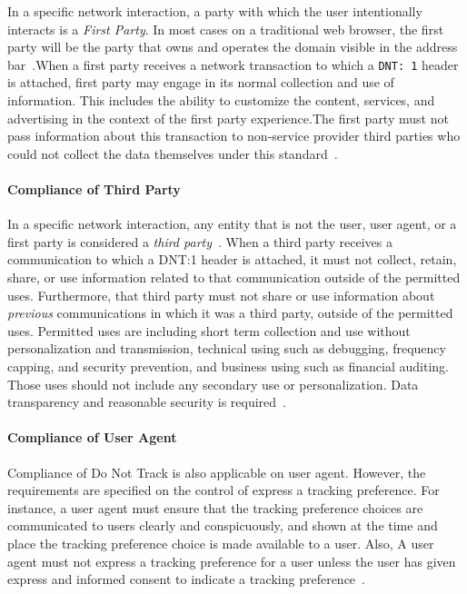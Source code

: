 \documentclass{sig-alternate}
\begin{document}
In a specific network interaction, a party with which the user intentionally interacts is a \emph{First Party}. In most cases on a traditional web browser, the first party will be the party that owns and operates the domain visible in the address bar~\cite{w3ctrackingcompliance}.When a first party receives a network transaction to which a \verb|DNT: 1| header is attached, first party may engage in its normal collection and use of information. This includes the ability to customize the content, services, and advertising in the context of the first party experience.The first party must not pass information about this transaction to non-service provider third parties who could not collect the data themselves under this standard~\cite{w3ctrackingcompliance}.

\paragraph{Compliance of Third Party}

In a specific network interaction, any entity that is not the user, user agent, or a first party is considered a \emph{third party}~\cite{w3ctrackingcompliance}. When a third party receives a communication to which a DNT:1 header is attached, it must not collect, retain, share, or use information related to that communication outside of the permitted uses. Furthermore, that third party must not share or use information about \emph{previous} communications in which it was a third party, outside of the permitted uses. Permitted uses are including short term collection and use without personalization and transmission, technical using such as debugging, frequency capping, and security prevention, and business using such as financial auditing. Those uses should not include any secondary use or personalization. Data transparency and reasonable security is required~\cite{w3ctrackingcompliance}.

\paragraph{Compliance of User Agent}

Compliance of Do Not Track is also applicable on user agent. However, the requirements are specified on the control of express a tracking preference. For instance, a user agent must ensure that the tracking preference choices are communicated to users clearly and conspicuously, and shown at the time and place the tracking preference choice is made available to a user. Also, A user agent must not express a tracking preference for a user unless the user has given express and informed consent to indicate a tracking preference~\cite{w3ctrackingcompliance}.
\end{document}
